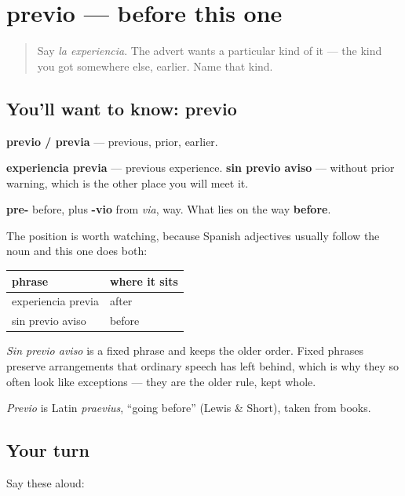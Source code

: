 \section[previo]{previo — before this one}

\label{lesson:ES-C435-previo}



\begin{quote}
Say \emph{la experiencia}. The advert wants a particular kind of it — the kind you got somewhere else, earlier. Name that kind.
\end{quote}

\subsection*{You'll want to know: previo}
\textbf{previo / previa} — previous, prior, earlier.

\textbf{experiencia previa} — previous experience. \textbf{sin previo aviso} — without prior warning, which is the other place you will meet it.

\begin{cousinweb}
\textbf{pre-} before, plus \textbf{-vio} from \emph{via}, way. What lies on the way \textbf{before}.

The position is worth watching, because Spanish adjectives usually follow the noun and this one does both:

\noindent
\begin{tabularx}{\linewidth}{@{}>{\raggedright\arraybackslash}X>{\raggedright\arraybackslash}X@{}}
\toprule
\textbf{phrase} & \textbf{where it sits} \\
\midrule
experiencia previa & after \\
sin previo aviso & before \\
\bottomrule
\end{tabularx}

\emph{Sin previo aviso} is a fixed phrase and keeps the older order. Fixed phrases preserve arrangements that ordinary speech has left behind, which is why they so often look like exceptions — they are the older rule, kept whole.

\emph{Previo} is Latin \emph{praevius}, \textquotedblleft{}going before\textquotedblright{} (Lewis \& Short), taken from books.
\end{cousinweb}

\subsection*{Your turn}
Say these aloud:

